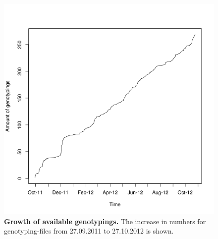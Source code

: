 \documentclass[10pt]{article}
\begin{document}
\begin{figure}[!ht]
	\begin{center}
		\includegraphics[scale=0.35]{25_10_2012_Graphs/genotypes.png}
	\end{center}
	\caption{
	{\bf Growth of available genotypings.} The increase in numbers for genotyping-files from 27.09.2011 to 27.10.2012 is shown.} 
	\label{Figure2_label}
\end{figure}
\end{document}
